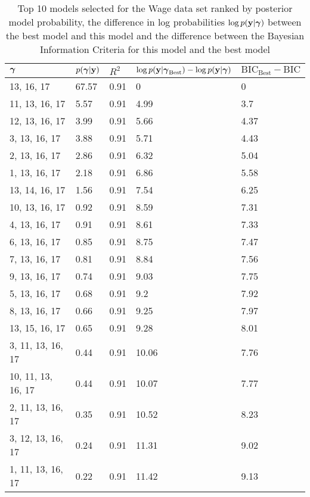 \documentclass{amsart}
\begin{document}
\begin{table}
\label{tab:numerical_results_wage}
\caption{Top 10 models selected for the Wage data set ranked by posterior model probability, the difference
					in log probabilities $\log p({\bf y}|{\boldsymbol \gamma})$ between the best model and this model and the difference
					between the Bayesian Information Criteria for this model and the best model}
\begin{tabular}{|l|llll|}
\hline
${\boldsymbol \gamma}$ & $p({\boldsymbol \gamma}|{\bf y})$ & $R^2$ & $\log p({\bf y} | {\boldsymbol \gamma}_\text{Best}) - \log p({\bf y} | {\boldsymbol \gamma})$ & $\text{BIC}_\text{Best} - \text{BIC}$ \\
\hline
13, 16, 17&  67.57&  0.91&  0&  0\\
11, 13, 16, 17&  5.57&  0.91&  4.99&  3.7\\
12, 13, 16, 17&  3.99&  0.91&  5.66&  4.37\\
3, 13, 16, 17&  3.88&  0.91&  5.71&  4.43\\
2, 13, 16, 17&  2.86&  0.91&  6.32&  5.04\\
1, 13, 16, 17&  2.18&  0.91&  6.86&  5.58\\
13, 14, 16, 17&  1.56&  0.91&  7.54&  6.25\\
10, 13, 16, 17&  0.92&  0.91&  8.59&  7.31\\
4, 13, 16, 17&  0.91&  0.91&  8.61&  7.33\\
6, 13, 16, 17&  0.85&  0.91&  8.75&  7.47\\
7, 13, 16, 17&  0.81&  0.91&  8.84&  7.56\\
9, 13, 16, 17&  0.74&  0.91&  9.03&  7.75\\
5, 13, 16, 17&  0.68&  0.91&  9.2&  7.92\\
8, 13, 16, 17&  0.66&  0.91&  9.25&  7.97\\
13, 15, 16, 17&  0.65&  0.91&  9.28&  8.01\\
3, 11, 13, 16, 17&  0.44&  0.91&  10.06&  7.76\\
10, 11, 13, 16, 17&  0.44&  0.91&  10.07&  7.77\\
2, 11, 13, 16, 17&  0.35&  0.91&  10.52&  8.23\\
3, 12, 13, 16, 17&  0.24&  0.91&  11.31&  9.02\\
1, 11, 13, 16, 17&  0.22&  0.91&  11.42&  9.13\\
\hline
\end{tabular}
\end{table}
\end{document}
